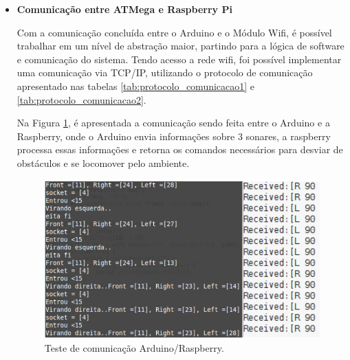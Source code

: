 \begin{itemize}
			\item \textbf{Comunicação entre ATMega e Raspberry Pi}

				Com a comunicação concluída entre o Arduino e o Módulo Wifi, é possível trabalhar em um nível de abstração maior, partindo para a lógica de software e comunicação do sistema. Tendo acesso a rede wifi, foi possível implementar uma comunicação via TCP/IP, utilizando o protocolo de comunicação apresentado nas tabelas \ref{tab:protocolo_comunicacao1} e \ref{tab:protocolo_comunicacao2}.		

				Na Figura \ref{img:dois_lados_comunicacao}, é apresentada a comunicação sendo feita entre o Arduino e a Raspberry, onde o Arduino envia informações sobre 3 sonares, a raspberry processa essas informações e retorna os comandos necessários para desviar de obstáculos e se locomover pelo ambiente.

				\begin{figure}[H]                                                           
			  		\centering                    
			  		\includegraphics[scale=0.4]{figuras/teste_arduino_rasp}               
			  		\caption{Teste de comunicação Arduino/Raspberry.}    
			  		\label{img:dois_lados_comunicacao}                                            
				\end{figure}

		\end{itemize}
